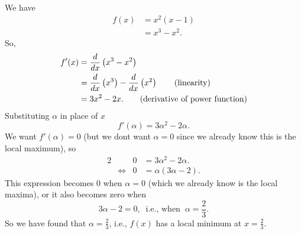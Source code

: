 \noindent We have
\begin{align*}
f(x)   & = x^2(x-1) \\
	& = x^3 - x^2.
\end{align*}
So,
\begin{align*}
f'(x)  & = \frac{d}{dx}\left(x^3 - x^2\right) \\
	& = \frac{d}{dx}\left(x^3\right) - \frac{d}{dx}\left(x^2\right) \tag{linearity} \\
	& = 3x^2 - 2x. \tag{derivative of power function} 
\end{align*}
Substituting $\alpha$ in place of $x$
\[
f'(\alpha) = 3\alpha^2 - 2\alpha.
\]
We want $f'(\alpha) = 0$ (but we dont want $\alpha = 0$ since we already know this is the local maximum), so
\begin{alignat*}{2}
	&
	& 0
	& = 3\alpha^2 - 2\alpha. \\
	& \iff
	& 0
	& = \alpha(3\alpha - 2). \tag{factorising}
\end{alignat*}
This expression becomes $0$ when $\alpha = 0$ (which we already know is the local maxima), or it also becomes zero when
\[
3\alpha - 2 = 0, \;\; \text{i.e., when} \;\; \alpha = \frac{2}{3}.
\]
So we have found that $\alpha = \frac{2}{3}$, i.e., $f(x)$ has a local minimum at $x = \frac{2}{3}$. \\


  	\bigskip
	
	\hfil{}
	\bigskip
	\bigskip
	
